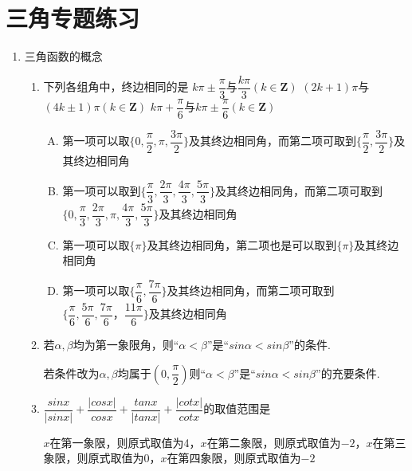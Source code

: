\chapter*{三角专题练习}
\begin{enumerate}
    \item 三角函数的概念
    \begin{enumerate}
        \item 下列各组角中，终边相同的是
        {$k\pi \pm \dfrac{\pi}{3}$与$\dfrac{k\pi}{3} (k \in \mathbf{Z})$}
        {$(2k+1)\pi$与$(4k \pm 1)\pi (k \in \mathbf{Z})$}
        {$k\pi + \dfrac{\pi}{6}$与$k\pi \pm \dfrac{\pi}{6} (k \in \mathbf{Z})$}
        \begin{jieda}
            \begin{enumerate}[A.]
                \item 第一项可以取$\{0, \dfrac{\pi}{2}, \pi, \dfrac{3\pi}{2} \}$及其终边相同角，而第二项可取到$\{\dfrac{\pi}{2}, \dfrac{3\pi}{2}\}$及其终边相同角
                \item 第一项可以取到$\{\dfrac{\pi}{3}, \dfrac{2\pi}{3}, \dfrac{4\pi}{3},\dfrac{5\pi}{3}\}$及其终边相同角，而第二项可取到$\{0, \dfrac{\pi}{3}, \dfrac{2\pi}{3}, \pi, \dfrac{4\pi}{3},\dfrac{5\pi}{3}\}$及其终边相同角
                \item 第一项可以取$\{\pi\}$及其终边相同角，第二项也是可以取到$\{\pi\}$及其终边相同角
                \item 第一项可以取$\{\dfrac{\pi}{6}, \dfrac{7\pi}{6}\}$及其终边相同角，而第二项可取到$\{\dfrac{\pi}{6}, \dfrac{5\pi}{6}, \dfrac{7\pi}{6}，\dfrac{11\pi}{6}\}$及其终边相同角
            \end{enumerate}
        \end{jieda}
        \item 若$\alpha, \beta$均为第一象限角，则“$\alpha < \beta$”是“$sin\alpha < sin\beta$”的条件.
        \begin{jieda}
            若条件改为$\alpha, \beta$均属于$(0, \dfrac{\pi}{2})$则“$\alpha < \beta$”是“$sin\alpha < sin\beta$”的充要条件.
        \end{jieda}
        \item $\dfrac{sinx}{|sinx|} + \dfrac{|cosx|}{cosx} + \dfrac{tanx}{|tanx|} + \dfrac{|cotx|}{cotx}$的取值范围是
        \begin{jieda}
            $x$在第一象限，则原式取值为4，$x$在第二象限，则原式取值为$-2$，$x$在第三象限，则原式取值为0，$x$在第四象限，则原式取值为$-2$

\end{jieda}
\end{enumerate}
\end{enumerate}
